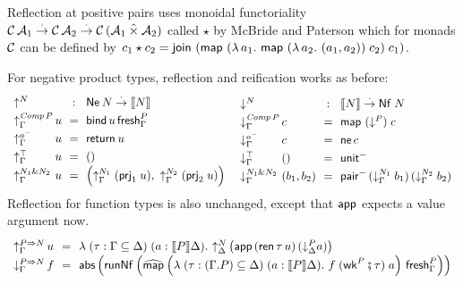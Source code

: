 \documentclass[a4paper,USenglish,cleveref, autoref]{lipics-v2019}
\begin{document}
Reflection at positive pairs uses monoidal functoriality
$\mathcal{C}\,\mathcal{A}_1 \stackrel{\cdot}{\to} \mathcal{C}\,\mathcal{A}_2 \stackrel{\cdot}{\to} \mathcal{C}\,(\mathcal{A}_1 \mathbin{\hat\times} \mathcal{A}_2)$
called $\star$ by McBride and Paterson \cite[Section 7]{mcbridePaterson:applicative}
which for monads $\mathcal{C}$ can be defined by
$c_1 \star c_2 =
   \mathsf{join}^{} \; (\mathsf{map}^{}\;(\lambda\,a_1.\
   \mathsf{map}^{}\;(\lambda\,a_2.\ (a_1,a_2))
    \;c_2)
    \;c_1)$.

For negative product types, reflection and reification works as before:
\[
\def\arraystretch{1.3}
\begin{array}{l@{\,}l@{~~}c@{~~}l}
  \multicolumn 2 l {\up N} & : & \tNe\,N \todot \den N \\
  \upG {\Comp P} & u & = & \tbind\,u\,\tfresh^P_\Gamma \\
  \upG \natom    & u & = & \treturn\,u \\
  \upG \top      & u & = & \ttempty \\
  \upG {N_1 \ntimes N_2} & u & = & \left(
    \upG {N_1} \; (\prj 1 u)
    ,\
    \upG {N_2} \; (\prj 2 u)
    \right) \\
\end{array}
\
\begin{array}{l@{\,}l@{~~}c@{~~}l}
  \multicolumn 2 l {\down N} & : & \den N \todot \tNf\;N \\
  \downG {\Comp P} & c  & = & \tmap\;(\down P)\;c \\
  \downG \natom    & c  & = & \tne\,c \\
  \downG \top      & () & = & \nunit \\
  \downG {N_1 \ntimes N_2} & (b_1,b_2) & = & \npair
    \, (\downG {N_1} \; b_1)
    \, (\downG {N_2} \; b_2)
    \\
\end{array}
\]
Reflection for function types is also unchanged, except that $\mathsf{app}$
expects a value argument now.
\[
\def\arraystretch{1.3}
\begin{array}{l@{\,}l@{~~}c@{~~}l}
  \upG {P \To N} & u & = & \lambda
    \;(\tau : \Gamma \sublist \Delta)
    \;(a : \den P \Delta)
    . \
    \up[\Delta] N \left( \tapp\,(\tren\,\tau\,u)\,(\down[\Delta] P a) \right)
    \\
  \downG {P \To N} & f & = & \tabs \left( \trunNf \left(
    \stmap
      \left(
        \lambda
          \;(\tau : (\cext \Gamma P) \sublist \Delta)
          \;(a : \den P \Delta)
          . \
          f\; (\twk^P \rcomp \tau)\; a
        \right)
      \,\tfresh^P_\Gamma
    \right) \right)
    \\
\end{array}
\]
\end{document}
